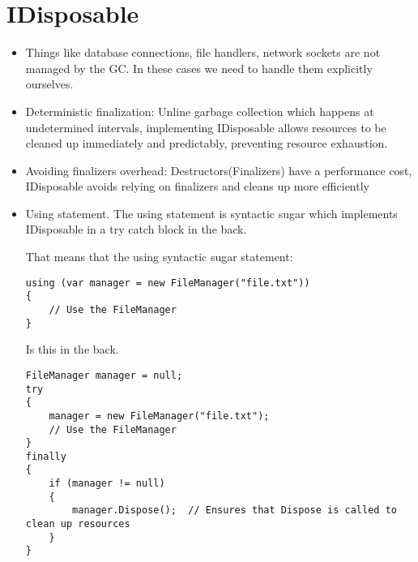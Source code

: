 \section{IDisposable}
\begin{itemize}
    \item Things like database connections, file handlers, network sockets are not managed by the GC. In these cases we need to handle them explicitly ourselves.
    \item Deterministic finalization: Unline garbage collection which happens at undetermined intervals, implementing IDisposable allows resources to be cleaned up immediately and predictably, preventing resource exhaustion. 
    \item Avoiding finalizers overhead: Destructors(Finalizers) have a performance cost, IDisposable avoids relying on finalizers and cleans up more efficiently
    \item Using statement. The using statement is syntactic sugar which implements IDisposable in a try catch block in the back.

    That means that the using syntactic sugar statement:
    
    \begin{lstlisting}
using (var manager = new FileManager("file.txt"))
{
    // Use the FileManager
}
    \end{lstlisting}

Is this in the back.

\begin{lstlisting}
FileManager manager = null;
try
{
    manager = new FileManager("file.txt");
    // Use the FileManager
}
finally
{
    if (manager != null)
    {
        manager.Dispose();  // Ensures that Dispose is called to clean up resources
    }
}
\end{lstlisting}
\end{itemize}